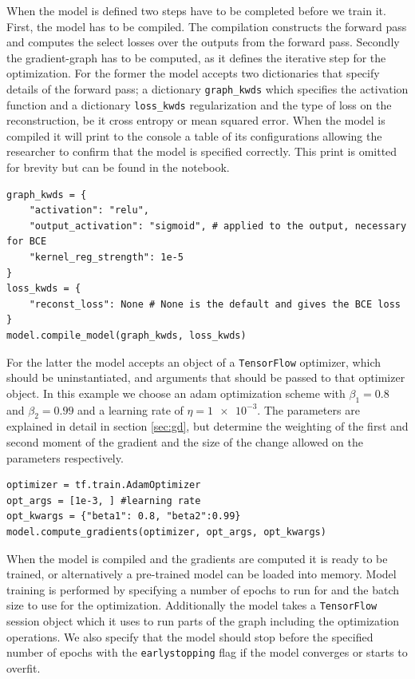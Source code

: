 \noindent When the model is defined two steps have to be completed before we train it. First, the model has to be compiled. The compilation constructs the forward pass and computes the select losses over the outputs from the forward pass. Secondly the gradient-graph has to be computed, as it defines the iterative step for the optimization. For the former the model accepts two dictionaries that specify details of the forward pass; a dictionary \lstinline{graph_kwds} which specifies the activation function and a dictionary \lstinline{loss_kwds} regularization and the type of loss on the reconstruction, be it cross entropy or mean squared error. When the model is compiled it will print to the console a table of its configurations allowing the researcher to confirm that the model is specified correctly. This print is omitted for brevity but can be found in the notebook.


\begin{minipage}{\linewidth}
\begin{lstlisting}[language=iPython]
graph_kwds = {
    "activation": "relu",
    "output_activation": "sigmoid", # applied to the output, necessary for BCE
    "kernel_reg_strength": 1e-5
}
loss_kwds = {
    "reconst_loss": None # None is the default and gives the BCE loss 
}
model.compile_model(graph_kwds, loss_kwds)
\end{lstlisting}
\end{minipage}


\noindent For the latter the model accepts an object of a \lstinline{TensorFlow} optimizer, which should be uninstantiated, and arguments that should be passed to that optimizer object. In this example we choose an adam optimization scheme with $\beta_1 = 0.8$ and $\beta_2=0.99$ and a learning rate of $\eta=\num{1e-3}$. The parameters are explained in detail in section \ref{sec:gd}, but determine the weighting of the first and second moment of the gradient and the size of the change allowed on the parameters respectively. 

\begin{minipage}{\linewidth}
\begin{lstlisting}[language=iPython]
optimizer = tf.train.AdamOptimizer
opt_args = [1e-3, ] #learning rate
opt_kwargs = {"beta1": 0.8, "beta2":0.99}
model.compute_gradients(optimizer, opt_args, opt_kwargs)
\end{lstlisting}
\end{minipage}

\noindent When the model is compiled and the gradients are computed it is ready to be trained, or alternatively a pre-trained model can be loaded into memory. Model training is performed by specifying a number of epochs to run for and the batch size to use for the optimization. Additionally the model takes a \lstinline{TensorFlow} session object which it uses to run parts of the graph including the optimization operations. We also specify that the model should stop before the specified number of epochs with the \lstinline{earlystopping} flag if the model converges or starts to overfit.

